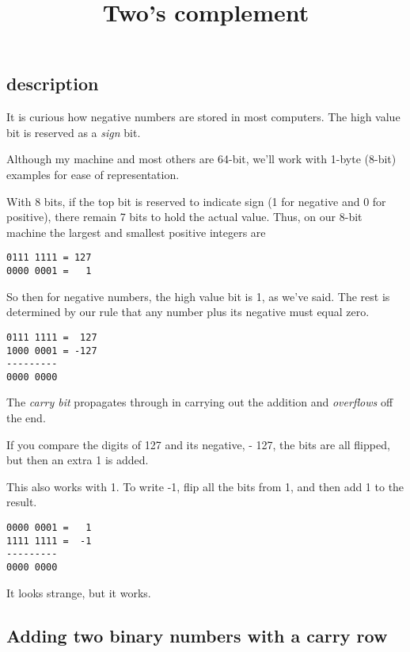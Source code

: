 \documentclass[11pt, oneside]{article}
\title{Two's complement}
\date{}
\begin{document}
\maketitle
\Large


\subsection*{description}

It is curious how negative numbers are stored in most computers.  The high value bit is reserved as a \emph{sign} bit.  

Although my machine and most others are 64-bit, we'll work with 1-byte (8-bit) examples for ease of representation.

With 8 bits, if the top bit is reserved to indicate sign (1 for negative and 0 for positive), there remain 7 bits to hold the actual value.  Thus, on our 8-bit machine the largest and smallest positive integers are
\begin{verbatim}
0111 1111 = 127
0000 0001 =   1
\end{verbatim}

So then for negative numbers, the high value bit is 1, as we've said.  The rest is determined by our rule that any number plus its negative must equal zero.

\begin{verbatim}
0111 1111 =  127
1000 0001 = -127
---------
0000 0000
\end{verbatim}

The \emph{carry bit} propagates through in carrying out the addition and \emph{overflows} off the end.  

If you compare the digits of 127 and its negative, - 127, the bits are all flipped, but then an extra 1 is added.  

This also works with 1.  To write -1, flip all the bits from 1, and then add 1 to the result.

\begin{verbatim}
0000 0001 =   1
1111 1111 =  -1
---------
0000 0000
\end{verbatim}

It looks strange, but it works.

\subsection*{Adding two binary numbers with a carry row}
\end{document}
